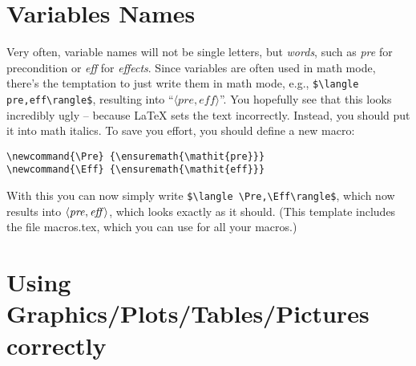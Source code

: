 \section{Variables Names}

Very often, variable names will not be single letters, but \emph{words}, such as \emph{pre} for precondition or \emph{eff} for \emph{effects}. Since variables are often used in math mode, there's the temptation to just write them in math mode, e.g., \verb!$\langle pre,eff\rangle$!, resulting into ``$\langle pre,eff\rangle$''. You hopefully see that this looks incredibly ugly -- because \LaTeX{} sets the text incorrectly. Instead, you should put it into math italics. To save you effort, you should define a new macro:
\begin{center}
  \verb!\newcommand{\Pre} {\ensuremath{\mathit{pre}}}!\\
  \verb!\newcommand{\Eff} {\ensuremath{\mathit{eff}}}!
\end{center}
  
With this you can now simply write \verb!$\langle \Pre,\Eff\rangle$!, which now results into $\langle \Pre,\Eff\rangle$, which looks exactly as it should. (This template includes the file macros.tex, which you can use for all your macros.)



\section{Using Graphics/Plots/Tables/Pictures correctly}



